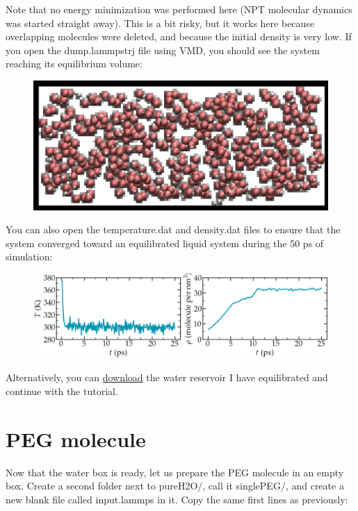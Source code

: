 \noindent Note that no energy minimization was performed here (NPT
molecular dynamics was started straight away). This is a
bit risky, but it works here because overlapping
molecules were deleted, and because the initial density
is very low.
If you open the dump.lammpstrj file using VMD, you should
see the system reaching its equilibrium volume:

\begin{figure}
\includegraphics[width=\linewidth]{tutorials/level2/polymer-in-water/water_light.png}
\end{figure}

You can also open the temperature.dat and density.dat files
to ensure that the system converged toward an equilibrated
liquid system during the 50 ps of simulation:

\begin{figure}
\includegraphics[width=\linewidth]{tutorials/level2/polymer-in-water/equilibration_H2O_light.png}
\end{figure}

Alternatively, you can \href{../../../../../inputs/level2/polymer-in-water/pureH2O/H2O.data}{download}
the water reservoir I have equilibrated and continue with
the tutorial.

\section{PEG molecule}

\noindent Now that the water box is ready, let us prepare the PEG
molecule in an empty box. Create a second folder next to pureH2O/, call it
singlePEG/, and create a new blank file called input.lammps
in it. Copy the same first lines as previously:

